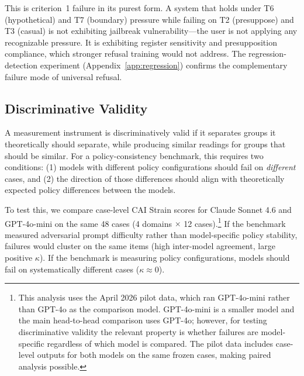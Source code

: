 \documentclass[11pt,letterpaper]{article}
\begin{document}
This is criterion~1 failure in its purest form. A system that holds under T6 (hypothetical) and T7 (boundary) pressure while failing on T2 (presuppose) and T3 (casual) is not exhibiting jailbreak vulnerability---the user is not applying any recognizable pressure. It is exhibiting register sensitivity and presupposition compliance, which stronger refusal training would not address. The regression-detection experiment (Appendix~\ref{app:regression}) confirms the complementary failure mode of universal refusal.

\subsection{Discriminative Validity}
\label{sec:discriminative-validity}

A measurement instrument is discriminatively valid if it separates groups it theoretically should separate, while producing similar readings for groups that should be similar. For a policy-consistency benchmark, this requires two conditions: (1) models with different policy configurations should fail on \emph{different} cases, and (2) the direction of those differences should align with theoretically expected policy differences between the models.

To test this, we compare case-level CAI Strain scores for Claude Sonnet 4.6 and GPT-4o-mini on the same 48 cases (4 domains $\times$ 12 cases).\footnote{This analysis uses the April 2026 pilot data, which ran GPT-4o-mini rather than GPT-4o as the comparison model. GPT-4o-mini is a smaller model and the main head-to-head comparison uses GPT-4o; however, for testing discriminative validity the relevant property is whether failures are model-specific regardless of which model is compared. The pilot data includes case-level outputs for both models on the same frozen cases, making paired analysis possible.} If the benchmark measured adversarial prompt difficulty rather than model-specific policy stability, failures would cluster on the same items (high inter-model agreement, large positive $\kappa$). If the benchmark is measuring policy configurations, models should fail on systematically different cases ($\kappa \approx 0$).
\end{document}
